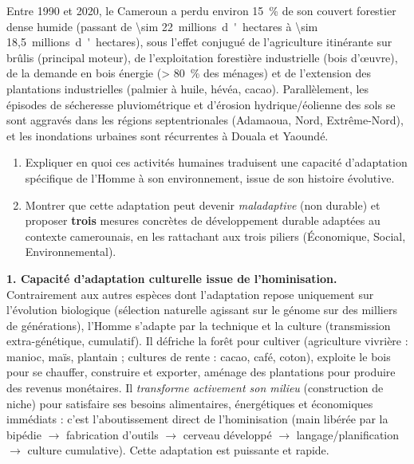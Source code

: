 \documentclass[11pt]{article}
\newcommand{\cle}[1]{{\popxbold\color{popdark}#1}}
\begin{document}
\begin{exoresolu}
Entre 1990 et 2020, le Cameroun a perdu environ \SI{15}{\%} de son couvert forestier dense humide (passant de \SI{\sim 22}{millions d'hectares} à \SI{\sim 18,5}{millions d'hectares}), sous l'effet conjugué de l'agriculture itinérante sur brûlis (principal moteur), de l'exploitation forestière industrielle (bois d'œuvre), de la demande en bois énergie (\SI{> 80}{\%} des ménages) et de l'extension des plantations industrielles (palmier à huile, hévéa, cacao). Parallèlement, les épisodes de sécheresse pluviométrique et d'érosion hydrique/éolienne des sols se sont aggravés dans les régions septentrionales (Adamaoua, Nord, Extrême-Nord), et les inondations urbaines sont récurrentes à Douala et Yaoundé.
\begin{enumerate}
\item Expliquer en quoi ces activités humaines traduisent une capacité d'adaptation spécifique de l'Homme à son environnement, issue de son histoire évolutive.
\item Montrer que cette adaptation peut devenir \emph{maladaptive} (non durable) et proposer \textbf{trois} mesures concrètes de développement durable adaptées au contexte camerounais, en les rattachant aux trois piliers (Économique, Social, Environnemental).
\end{enumerate}
\tcblower
\textbf{1. Capacité d'adaptation culturelle issue de l'hominisation.} Contrairement aux autres espèces dont l'adaptation repose uniquement sur l'évolution biologique (sélection naturelle agissant sur le génome sur des milliers de générations), l'Homme s'adapte par la \cle{technique} et la \cle{culture} (transmission extra-génétique, cumulatif). Il défriche la forêt pour cultiver (agriculture vivrière : manioc, maïs, plantain ; cultures de rente : cacao, café, coton), exploite le bois pour se chauffer, construire et exporter, aménage des plantations pour produire des revenus monétaires. Il \emph{transforme activement son milieu} (construction de niche) pour satisfaire ses besoins alimentaires, énergétiques et économiques immédiats : c'est l'aboutissement direct de l'hominisation (main libérée par la bipédie $\rightarrow$ fabrication d'outils $\rightarrow$ cerveau développé $\rightarrow$ langage/planification $\rightarrow$ culture cumulative). Cette adaptation est puissante et rapide.


\end{exoresolu}
\end{document}
